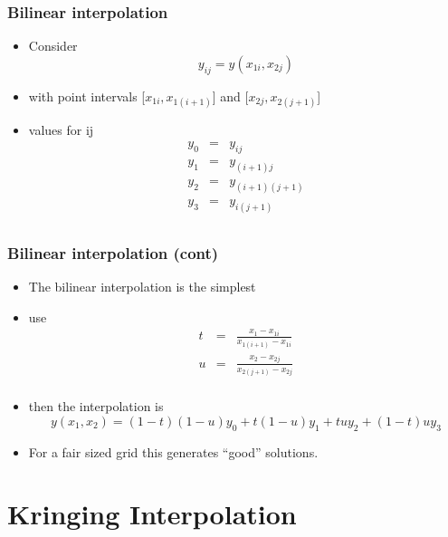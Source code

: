 \documentclass[10pt]{beamer}
\begin{document}
\begin{frame}
  \frametitle{Bilinear interpolation}
  \begin{itemize}
  \item Consider
    \[ y_{ij} = y(x _{1i}, x_{2j}) \]
  \item with point intervals [$x_{1i}, x_{1(i+1)}$] and  [$x_{2j}, x_{2(j+1)}$] 
  \item values for ij
    \[
      \begin{array}{ccc}
        y_0& = & y_{ij}\\
        y_1& = & y_{(i+1)j}\\
        y_2& = & y_{(i+1)(j+1)}\\
        y_3& = & y_{i(j+1)}\\
      \end{array}
    \]
  \end{itemize}
\end{frame}

\begin{frame}
  \frametitle{Bilinear interpolation (cont)}
  \begin{itemize}
  \item The bilinear interpolation is the simplest
  \item use
    \[
      \begin{array}{ccc}
        t & = & \frac{x_1 - x_{1i}}{x_{1(i+1)} - x_{1i}}\\
        u & = & \frac{x_2 - x_{2j}}{x_{2(j+1)} - x_{2j}}\\
      \end{array}
    \]
  \item then the interpolation is
    \[
      y(x_1, x_2) = (1-t)(1-u) y_0 + t(1-u) y_1 + tu y_2 + (1-t)u y_3
    \]
  \item For a fair sized grid this generates ``good'' solutions. 
  \end{itemize}
\end{frame}

\section{Kringing Interpolation}
\end{document}
